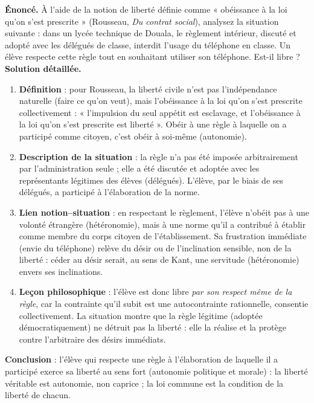 \documentclass[11pt]{article}
\newcommand{\cle}[1]{{\popxbold\color{popdark}#1}}
\begin{document}
\begin{exoresolu}
\textbf{Énoncé.} À l'aide de la notion de liberté définie comme « obéissance à la loi qu'on s'est prescrite » (Rousseau, \emph{Du contrat social}), analysez la situation suivante : dans un lycée technique de Douala, le règlement intérieur, discuté et adopté avec les délégués de classe, interdit l'usage du téléphone en classe. Un élève respecte cette règle tout en souhaitant utiliser son téléphone. Est-il libre ?
\tcblower
\textbf{Solution détaillée.}
\begin{enumerate}
\item \textbf{Définition} : pour Rousseau, la liberté civile n'est pas l'indépendance naturelle (faire ce qu'on veut), mais l'obéissance à la loi qu'on s'est prescrite collectivement : « l'impulsion du seul appétit est esclavage, et l'obéissance à la loi qu'on s'est prescrite est liberté ». Obéir à une règle à laquelle on a participé comme citoyen, c'est obéir à soi-même (autonomie).
\item \textbf{Description de la situation} : la règle n'a pas été imposée arbitrairement par l'administration seule ; elle a été discutée et adoptée avec les représentants légitimes des élèves (délégués). L'élève, par le biais de ses délégués, a participé à l'élaboration de la norme.
\item \textbf{Lien notion–situation} : en respectant le règlement, l'élève n'obéit pas à une volonté étrangère (hétéronomie), mais à une norme qu'il a contribué à établir comme membre du corps citoyen de l'établissement. Sa frustration immédiate (envie du téléphone) relève du \cle{désir} ou de l'inclination sensible, non de la liberté : céder au désir serait, au sens de Kant, une \cle{servitude} (hétéronomie) envers ses inclinations.
\item \textbf{Leçon philosophique} : l'élève est donc libre \emph{par son respect même de la règle}, car la contrainte qu'il subit est une \cle{autocontrainte} rationnelle, consentie collectivement. La situation montre que la règle légitime (adoptée démocratiquement) ne détruit pas la liberté : elle la réalise et la protège contre l'arbitraire des désirs immédiats.
\end{enumerate}
\textbf{Conclusion} : l'élève qui respecte une règle à l'élaboration de laquelle il a participé exerce sa liberté au sens fort (autonomie politique et morale) : la liberté véritable est autonomie, non caprice ; la loi commune est la condition de la liberté de chacun.
\end{exoresolu}
\end{document}
